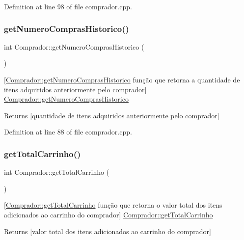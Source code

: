 Definition at line 98 of file comprador.\+cpp.

\mbox{\label{class_comprador_a18e5782aa451203303ebc3f1ff924f4e}} 
\subsubsection{\texorpdfstring{get\+Numero\+Compras\+Historico()}{getNumeroComprasHistorico()}}
{\footnotesize\ttfamily int Comprador\+::get\+Numero\+Compras\+Historico (\begin{DoxyParamCaption}{ }\end{DoxyParamCaption})}

\mbox{[}\hyperlink{class_comprador_a18e5782aa451203303ebc3f1ff924f4e}{Comprador\+::get\+Numero\+Compras\+Historico} função que retorna a quantidade de itens adquiridos anteriormente pelo comprador\mbox{]}  \hyperlink{class_comprador_a18e5782aa451203303ebc3f1ff924f4e}{Comprador\+::get\+Numero\+Compras\+Historico} \begin{DoxyReturn}{Returns}
\mbox{[}quantidade de itens adquiridos anteriormente pelo comprador\mbox{]} 
\end{DoxyReturn}


Definition at line 88 of file comprador.\+cpp.

\mbox{\label{class_comprador_aaff2a1d0fb260e9688367eb606c4eeb5}} 
\subsubsection{\texorpdfstring{get\+Total\+Carrinho()}{getTotalCarrinho()}}
{\footnotesize\ttfamily int Comprador\+::get\+Total\+Carrinho (\begin{DoxyParamCaption}{ }\end{DoxyParamCaption})}

\mbox{[}\hyperlink{class_comprador_aaff2a1d0fb260e9688367eb606c4eeb5}{Comprador\+::get\+Total\+Carrinho} função que retorna o valor total dos itens adicionados ao carrinho do comprador\mbox{]}  \hyperlink{class_comprador_aaff2a1d0fb260e9688367eb606c4eeb5}{Comprador\+::get\+Total\+Carrinho} \begin{DoxyReturn}{Returns}
\mbox{[}valor total dos itens adicionados ao carrinho do comprador\mbox{]} 
\end{DoxyReturn}


